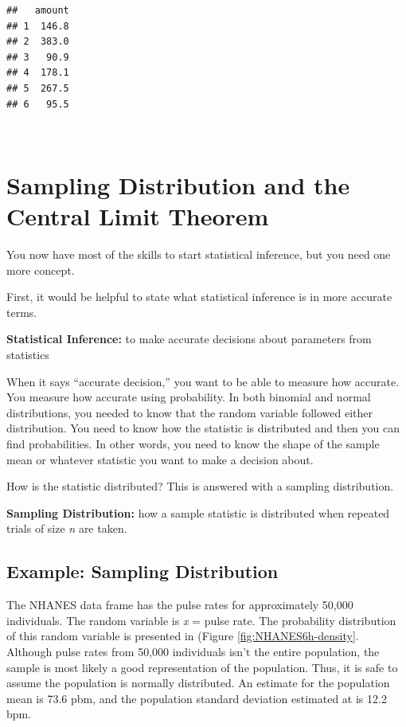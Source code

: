 \documentclass[]{book}
\begin{document}
\begin{verbatim}
##   amount
## 1  146.8
## 2  383.0
## 3   90.9
## 4  178.1
## 5  267.5
## 6   95.5
\end{verbatim}

\textbf{\\
}

\hypertarget{sampling-distribution-and-the-central-limit-theorem}{%
\section{Sampling Distribution and the Central Limit Theorem}\label{sampling-distribution-and-the-central-limit-theorem}}

You now have most of the skills to start statistical inference, but you need one more concept.

First, it would be helpful to state what statistical inference is in more accurate terms.

\textbf{Statistical Inference:} to make accurate decisions about parameters from statistics

When it says ``accurate decision,'' you want to be able to measure how accurate. You measure how accurate using probability. In both binomial and normal distributions, you needed to know that the random variable followed either distribution. You need to know how the statistic is distributed and then you can find probabilities. In other words, you need to know the shape of the sample mean or whatever statistic you want to make a decision about.

How is the statistic distributed? This is answered with a sampling distribution.

\textbf{Sampling Distribution:} how a sample statistic is distributed when repeated trials of size \emph{n} are taken.

\hypertarget{example-sampling-distribution}{%
\subsection{Example: Sampling Distribution}\label{example-sampling-distribution}}

The NHANES data frame has the pulse rates for approximately 50,000 individuals. The random variable is \emph{x} = pulse rate. The probability distribution of this random variable is presented in (Figure \ref{fig:NHANES6h-density}. Although pulse rates from 50,000 individuals isn't the entire population, the sample is most likely a good representation of the population. Thus, it is safe to assume the population is normally distributed. An estimate for the population mean is 73.6 pbm, and the population standard deviation estimated at is 12.2 bpm.
\end{document}
